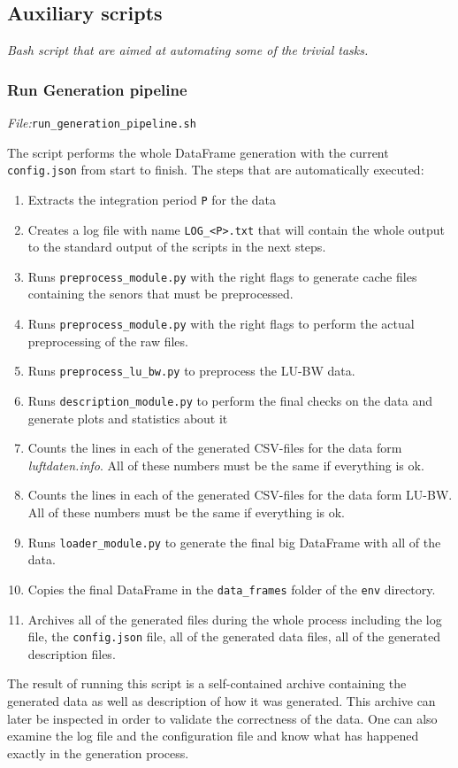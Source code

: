 \documentclass[12pt,a4paper,twoside]{scrartcl}
\numberwithin{equation}{section}
\begin{document}
\subsection{Auxiliary scripts}\label{sec:aux-scripts}
\noindent\emph{Bash script that are aimed at automating some of the trivial tasks.} 
\subsubsection{Run Generation pipeline}\label{sec:gen-pipe}
\noindent\emph{File:}\texttt{run\_generation\_pipeline.sh}

The script performs the whole DataFrame generation with the current \texttt{config.json} from start to finish. The steps that are automatically executed:
\begin{enumerate}
\item Extracts the integration period \texttt{P} for the data
\item Creates a log file with name \texttt{LOG\_<P>.txt} that will contain the whole output to the standard output of the scripts in the next steps.
\item Runs \texttt{preprocess\_module.py} with the right flags to generate cache files containing the senors that must be preprocessed.
\item Runs \texttt{preprocess\_module.py} with the right flags to perform the actual preprocessing of the raw files.
\item Runs \texttt{preprocess\_lu\_bw.py} to preprocess the LU-BW data.
\item Runs \texttt{description\_module.py} to perform the final checks on the data and generate plots and statistics about it
\item Counts the lines in each of the generated CSV-files for the data form \emph{luftdaten.info}. All of these numbers must be the same if everything is ok.
\item Counts the lines in each of the generated CSV-files for the data form LU-BW. All of these numbers must be the same if everything is ok.
\item Runs \texttt{loader\_module.py} to generate the final big DataFrame with all of the data.
\item Copies the final DataFrame in the \texttt{data\_frames} folder of the \texttt{env} directory.
\item Archives all of the generated files during the whole process including the log file, the \texttt{config.json} file, all of the generated data files, all of the generated description files.
\end{enumerate}
The result of running this script is a self-contained archive containing the generated data as well as description of how it was generated. This archive can later be inspected in order to validate the correctness of the data. One can also examine the log file and the configuration file and know what has happened exactly in the generation process.
\end{document}
